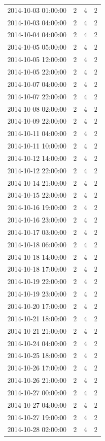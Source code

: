 \begin{tabular}{lrrr}
2014-10-03 01:00:00 & 2 & 4 & 2 \\
2014-10-03 04:00:00 & 2 & 4 & 2 \\
2014-10-04 04:00:00 & 2 & 4 & 2 \\
2014-10-05 05:00:00 & 2 & 4 & 2 \\
2014-10-05 12:00:00 & 2 & 4 & 2 \\
2014-10-05 22:00:00 & 2 & 4 & 2 \\
2014-10-07 04:00:00 & 2 & 4 & 2 \\
2014-10-07 22:00:00 & 2 & 4 & 2 \\
2014-10-08 02:00:00 & 2 & 4 & 2 \\
2014-10-09 22:00:00 & 2 & 4 & 2 \\
2014-10-11 04:00:00 & 2 & 4 & 2 \\
2014-10-11 10:00:00 & 2 & 4 & 2 \\
2014-10-12 14:00:00 & 2 & 4 & 2 \\
2014-10-12 22:00:00 & 2 & 4 & 2 \\
2014-10-14 21:00:00 & 2 & 4 & 2 \\
2014-10-15 22:00:00 & 2 & 4 & 2 \\
2014-10-16 19:00:00 & 2 & 4 & 2 \\
2014-10-16 23:00:00 & 2 & 4 & 2 \\
2014-10-17 03:00:00 & 2 & 4 & 2 \\
2014-10-18 06:00:00 & 2 & 4 & 2 \\
2014-10-18 14:00:00 & 2 & 4 & 2 \\
2014-10-18 17:00:00 & 2 & 4 & 2 \\
2014-10-19 22:00:00 & 2 & 4 & 2 \\
2014-10-19 23:00:00 & 2 & 4 & 2 \\
2014-10-20 17:00:00 & 2 & 4 & 2 \\
2014-10-21 18:00:00 & 2 & 4 & 2 \\
2014-10-21 21:00:00 & 2 & 4 & 2 \\
2014-10-24 04:00:00 & 2 & 4 & 2 \\
2014-10-25 18:00:00 & 2 & 4 & 2 \\
2014-10-26 17:00:00 & 2 & 4 & 2 \\
2014-10-26 21:00:00 & 2 & 4 & 2 \\
2014-10-27 00:00:00 & 2 & 4 & 2 \\
2014-10-27 04:00:00 & 2 & 4 & 2 \\
2014-10-27 19:00:00 & 2 & 4 & 2 \\
2014-10-28 02:00:00 & 2 & 4 & 2 \\

\end{tabular}
